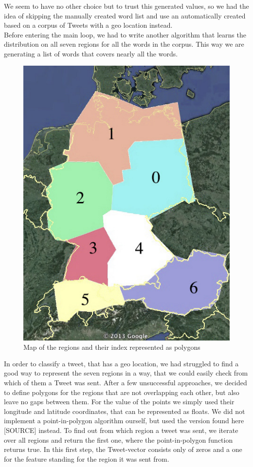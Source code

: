 \documentclass[../Main.tex]{subfiles}
\begin{document}
We seem to have no other choice but to trust this generated values, so we had the idea of skipping the manually created word list and use an automatically created based on a corpus of Tweets with a geo location instead. \\
Before entering the main loop, we had to write another algorithm that learns the distribution on all seven regions for all the words in the corpus. This way we are generating a list of words that covers nearly all the words.
\begin{figure}
  \begin{center}
   \includegraphics[width=0.5\columnwidth]{../img/polygone_satt.jpg}
    \caption{\label{geo_polymap} Map of the regions and their index represented as polygons}
  \end{center}
\end{figure}
In order to classify a tweet, that has a geo location, we had struggled to find a good way to represent the seven regions in a way, that we could easily check from which of them a Tweet was sent. After a few unsuccessful approaches, we decided to define polygons for the regions that are not overlapping each other, but also leave no gaps between them. For the value of the points we simply used their longitude and latitude coordinates, that can be represented as floats.  
We did not implement a point-in-polygon algorithm ourself, but used the version found here [SOURCE] instead. 
To find out from which region a tweet was sent, we iterate over all regions and return the first one, where the point-in-polygon function returns true.
In this first step, the Tweet-vector consists only of zeros and a one for the feature standing for the region it was sent from. 
\end{document}
